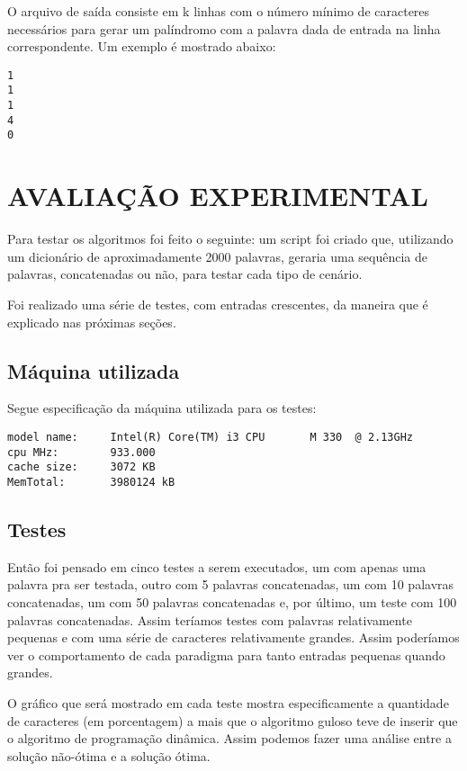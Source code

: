 \documentclass[12pt]{article}
\begin{document}
O arquivo de saída consiste em k linhas com o número mínimo de caracteres necessários para gerar um palíndromo com a palavra dada de entrada na linha correspondente. Um exemplo é mostrado abaixo:

\begin{verbatim}
1
1
1
4
0
\end{verbatim}


\section{AVALIAÇÃO EXPERIMENTAL}
\label{avaliacao_experimental}

Para testar os algoritmos foi feito o seguinte: um script foi criado que, utilizando um dicionário de aproximadamente 2000 palavras, geraria uma sequência de palavras, concatenadas ou não, para testar cada tipo de cenário.

Foi realizado uma série de testes, com entradas crescentes, da maneira que é explicado nas próximas seções.

\subsection{Máquina utilizada}
\label{maquina}

Segue especificação da máquina utilizada para os testes:
\begin{verbatim}
model name:     Intel(R) Core(TM) i3 CPU       M 330  @ 2.13GHz
cpu MHz:        933.000
cache size:     3072 KB
MemTotal:       3980124 kB
\end{verbatim}


\subsection{Testes}
\label{testes}

Então foi pensado em cinco testes a serem executados, um com apenas uma palavra pra ser testada, outro com 5 palavras concatenadas, um com 10 palavras concatenadas, um com 50 palavras concatenadas e, por último, um teste com 100 palavras concatenadas. Assim teríamos testes com palavras relativamente pequenas e com uma série de caracteres relativamente grandes. Assim poderíamos ver o comportamento de cada paradigma para tanto entradas pequenas quando grandes.

O gráfico que será mostrado em cada teste mostra especificamente a quantidade de caracteres (em porcentagem) a mais que o algoritmo guloso teve de inserir que o algoritmo de programação dinâmica. Assim podemos fazer uma análise entre a solução não-ótima e a solução ótima.
\end{document}
